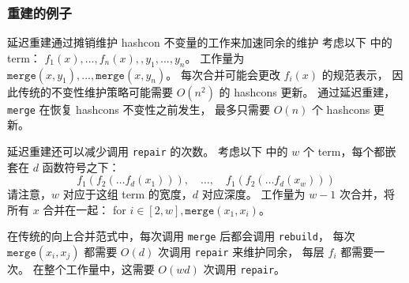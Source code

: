 \subsubsection{重建的例子}

延迟重建通过摊销维护 hashcon 不变量的工作来加速同余的维护 %
考虑以下 \egraph 中的 term：
  $f_{1}(x), ..., f_{n}(x),, y_{1}, ..., y_{n}$。
工作量为 $\texttt{merge}(x, y_{1}), ..., \texttt{merge}(x, y_{n})$。
每次合并可能会更改 $f_{i}(x)$ 的规范表示，
  因此传统的不变性维护策略可能需要 $O(n^{2})$ 的 hashcons 更新。
通过延迟重建，\texttt{merge} 在恢复 hashcons 不变性之前发生，
  最多只需要 $O(n)$ 个 hashcons 更新。


延迟重建还可以减少调用 \texttt{repair} 的次数。
考虑以下 \egraph 中的 $w$ 个 term，每个都嵌套在 $d$ 函数符号之下：
  $$f_1 (f_2(\ldots f_d(x_1))), \quad\ldots,\quad f_1(f_2(\ldots f_d(x_w)))$$
请注意，$w$ 对应于这组 term 的宽度，$d$ 对应深度。
工作量为 $w-1$ 次合并，将所有 $x$ 合并在一起：
  for $i \in [2, w], \texttt{merge}(x_{1}, x_{i})$。

在传统的向上合并范式中，每次调用 \texttt{merge} 后都会调用 \texttt{rebuild}，
  每次 $\texttt{merge}(x_i, x_j)$ 都需要 $O(d)$ 次调用 \texttt{repair} 来维护同余，
  每层 $f_{i}$ 都需要一次。
在整个工作量中，这需要 $O(wd)$ 次调用 \texttt{repair}。


